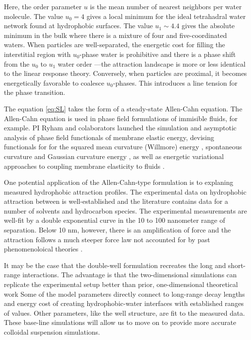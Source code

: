 Here, the order parameter $u$ is the mean number of nearest
neighbors per water molecule.
The value $u_0 = 4$ gives a local minimum for the ideal
tetrahadral water network found at hydrophobic surfaces.  
The value $u_1 \sim 4.4$ gives the absolute minimum
in the bulk where there is a mixture of four and five-coordinated
waters.
When particles are well-separated, the energetic cost for filling
the interstitial region with $u_0$-phase water is prohibitive
and there is a phase shift from the $u_0$ to $u_1$ water order
---the attraction landscape is more
or less identical to the linear response theory. Conversely, when
particles are proximal, it becomes energetically favorable
to coalesce $u_0$-phases. This introduces a line tension
for the phase transition.

The equation \eqref{eq:SL} takes the form of a steady-state
Allen-Cahn equation. The Allen-Cahn equation is used in phase field
formulations of immisible fluids, for example.
PI Ryham and colaborators launched the simulation and asymptotic analysis
of phase field functionals of membrane elastic energy,
devising functionals for  
for the squared mean curvature (Willmore) energy \cite{0951-7715-18-3-016}, 
spontaneous curvature \cite{Du05} and Gaussian curvature energy \cite{DuEuler},
as well as energetic variational approaches to coupling membrane elasticity to fluids \cite{QiangDu09}. 

One potential application of the Allen-Cahn-type formulation is to
explaning measured hydrophobic attraction profiles.
The experimental data on hydrophobic attraction between 
is well-established and the literature contains data for a number of
solvents and hydrocarbon species. The experimental measurements
are well-fit by a double exponential curve in the 10 to 100 nanometer range
of separation.  Below 10 nm, however, there is an amplification of force
and the attraction follows a much steeper force law not accounted
for by past phenomenoloical theories \cite{Lin2005}.

It may be the case that the double-well formulation recreates the
long and short-range interactions.  The advantage
is that the two-dimensional simulations can replicate the
experimental setup better than prior, one-dimensional theoretical work 
Some of the model parameters directly connect 
to long-range decay lengths and energy cost of creating hydrophobic-water
interfaces with established ranges of values. Other parameters, like the
well structure, are fit to the measured data. These base-line simulations
will allow us to move on to provide more accurate colloidal suspension
simulations. 

